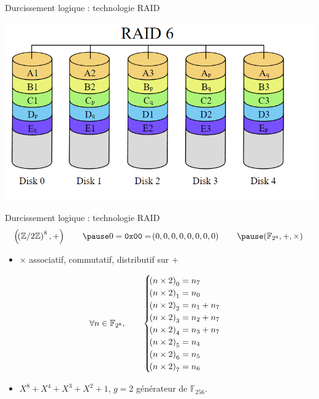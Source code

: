 \documentclass[french,bookmarks,aspectratio=43]{beamer}
\newcommand{\bdF}{\mathbb{F}}
\newcommand{\bdZ}{\mathbb{Z}}
\begin{document}
\begin{frame}{Durcissement logique : technologie RAID}
    \begin{center}
        \includegraphics[scale=0.3]{../Images/raid.png}
    \end{center}
\end{frame}

\begin{frame}{Durcissement logique : technologie RAID}
    \[ \p{\p{\bdZ/2\bdZ}^8, +} \qquad\pause 0 = \texttt{0x00} = \p{0, 0, 0, 0, 0, 0, 0, 0}\qquad\pause \p{\bdF_{2^8}, +, \times}\]\pause
    \begin{itemize}
        \item $\times$ associatif, commutatif, distributif sur $+$\pause
    \end{itemize}

    \[ \forall n \in \bdF_{2^8}, \qquad \begin{cases}\p{n \times 2}_0 = n_7\\
        \p{n \times 2}_1 = n_0\\
        \p{n \times 2}_2 = n_1 + n_7\\
        \p{n \times 2}_3 = n_2 + n_7\\
        \p{n \times 2}_4 = n_3 + n_7\\
        \p{n \times 2}_5 = n_4\\
        \p{n \times 2}_6 = n_5\\
        \p{n \times 2}_7 = n_6
        \end{cases}\]

    \begin{itemize}
        \item $X^8 + X^4 + X^3 + X^2 + 1$, \qquad\pause $g = 2$ générateur de $\bdF_{256}$.
    \end{itemize}
\end{frame}
\end{document}

